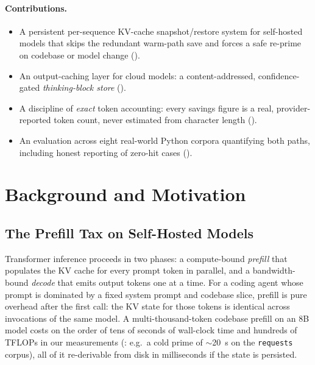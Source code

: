 \documentclass[10pt]{article}
\begin{document}
\paragraph{Contributions.}
\begin{itemize}
  \item A persistent per-sequence KV-cache snapshot/restore system for
  self-hosted models that skips the redundant warm-path save and forces a safe
  re-prime on codebase or model change ().
  \item An output-caching layer for cloud models: a content-addressed,
  confidence-gated \emph{thinking-block store} ().
  \item A discipline of \emph{exact} token accounting: every savings figure is
  a real, provider-reported token count, never estimated from character length
  ().
  \item An evaluation across eight real-world Python corpora quantifying both
  paths, including honest reporting of zero-hit cases ().
\end{itemize}

\section{Background and Motivation}
\label{sec:background}

\subsection{The Prefill Tax on Self-Hosted Models}
Transformer inference proceeds in two phases: a compute-bound \emph{prefill}
that populates the KV cache for every prompt token in parallel, and a
bandwidth-bound \emph{decode} that emits output tokens one at a time. For a
coding agent whose prompt is dominated by a fixed system prompt and codebase
slice, prefill is pure overhead after the first call: the KV state for those
tokens is identical across invocations of the same model. A multi-thousand-token
codebase prefill on an 8B model costs on the order of tens of seconds of
wall-clock time and hundreds of TFLOPs in our measurements (:
e.g.\ a cold prime of $\sim$\SI{20}{\second} on the \texttt{requests} corpus),
all of it re-derivable from disk in milliseconds if the state is persisted.
\end{document}
